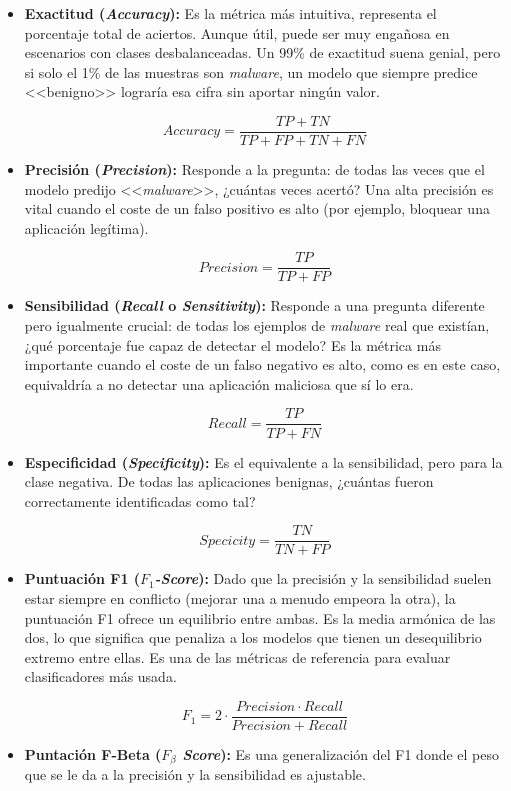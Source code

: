 \begin{itemize}
	\item \textbf{Exactitud (\textit{Accuracy}):} Es la métrica más intuitiva, representa el porcentaje total de aciertos. Aunque útil, puede ser muy engañosa en escenarios con clases desbalanceadas. Un 99\% de exactitud suena genial, pero si solo el 1\% de las muestras son \textit{malware}, un modelo que siempre predice <<benigno>> lograría esa cifra sin aportar ningún valor.

	\[Accuracy =\frac{TP + TN}{TP + FP + TN + FN}\]
	
	\item \textbf{Precisión (\textit{Precision}):} Responde a la pregunta: de todas las veces que el modelo predijo <<\textit{malware}>>, ¿cuántas veces acertó? Una alta precisión es vital cuando el coste de un falso positivo es alto (por ejemplo, bloquear una aplicación legítima).

	\[Precision = \frac{TP}{TP + FP}\]

	\item \textbf{Sensibilidad (\textit{Recall} o \textit{Sensitivity}):} Responde a una pregunta diferente pero igualmente crucial: de todas los ejemplos de \textit{malware} real que existían, ¿qué porcentaje fue capaz de detectar el modelo? Es la métrica más importante cuando el coste de un falso negativo es alto, como es en este caso, equivaldría a no detectar una aplicación maliciosa que sí lo era.
	
	\[Recall = \frac{TP}{TP + FN}\]
	
	\item \textbf{Especificidad (\textit{Specificity}):} Es el equivalente a la sensibilidad, pero para la clase negativa. De todas las aplicaciones benignas, ¿cuántas fueron correctamente identificadas como tal?
	
	\[Specicity = \frac{TN}{TN + FP}\]
	
	\item \textbf{Puntuación F1 (\textit{$F_1$-Score}):} Dado que la precisión y la sensibilidad suelen estar siempre en conflicto (mejorar una a menudo empeora la otra), la puntuación F1 ofrece un equilibrio entre ambas. Es la media armónica de las dos, lo que significa que penaliza a los modelos que tienen un desequilibrio extremo entre ellas. Es una de las métricas de referencia para evaluar clasificadores más usada.
	
	\[F_1 = 2 \cdot \frac{Precision \cdot Recall}{Precision + Recall}\]
	
	\item \textbf{Puntación F-Beta (\textit{$F_\beta$ Score}):} Es una generalización del F1 donde el peso que se le da a la precisión y la sensibilidad es ajustable.
	

\end{itemize}

